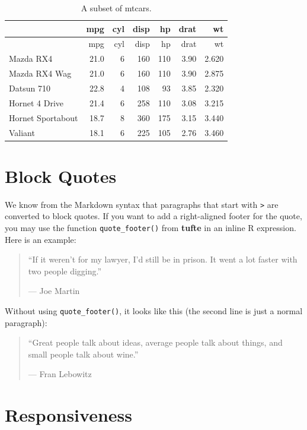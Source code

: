 \documentclass[]{tufte-handout}
\begin{document}
\begin{longtable}[]{@{}lrrrrrr@{}}
\caption{A subset of mtcars.}\tabularnewline
\toprule\noalign{}
& mpg & cyl & disp & hp & drat & wt \\
\midrule\noalign{}
\endfirsthead
\toprule\noalign{}
& mpg & cyl & disp & hp & drat & wt \\
\midrule\noalign{}
\endhead
\bottomrule\noalign{}
\endlastfoot
Mazda RX4 & 21.0 & 6 & 160 & 110 & 3.90 & 2.620 \\
Mazda RX4 Wag & 21.0 & 6 & 160 & 110 & 3.90 & 2.875 \\
Datsun 710 & 22.8 & 4 & 108 & 93 & 3.85 & 2.320 \\
Hornet 4 Drive & 21.4 & 6 & 258 & 110 & 3.08 & 3.215 \\
Hornet Sportabout & 18.7 & 8 & 360 & 175 & 3.15 & 3.440 \\
Valiant & 18.1 & 6 & 225 & 105 & 2.76 & 3.460 \\
\end{longtable}

\hypertarget{block-quotes}{%
\section{Block Quotes}\label{block-quotes}}

We know from the Markdown syntax that paragraphs that start with
\texttt{\textgreater{}} are converted to block quotes. If you want to
add a right-aligned footer for the quote, you may use the function
\texttt{quote\_footer()} from \textbf{tufte} in an inline R expression.
Here is an example:

\begin{quote}
``If it weren't for my lawyer, I'd still be in prison. It went a lot
faster with two people digging.''

\hfill --- Joe Martin
\end{quote}

Without using \texttt{quote\_footer()}, it looks like this (the second
line is just a normal paragraph):

\begin{quote}
``Great people talk about ideas, average people talk about things, and
small people talk about wine.''

--- Fran Lebowitz
\end{quote}

\hypertarget{responsiveness}{%
\section{Responsiveness}\label{responsiveness}}
\end{document}

